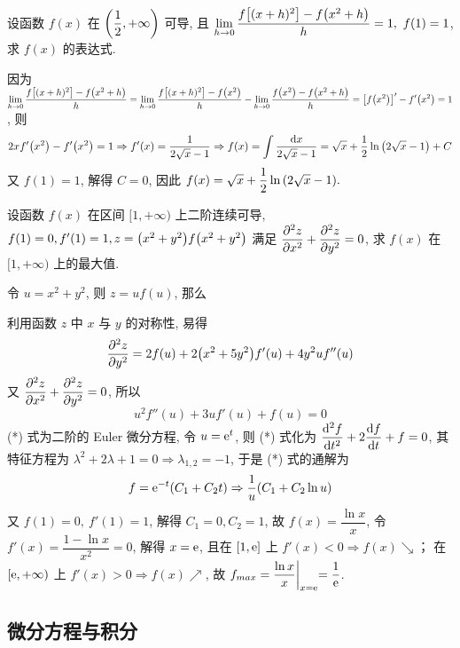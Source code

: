 \begin{example}
    设函数 $f(x)$ 在 $\qty(\dfrac{1}{2},+\infty)$ 可导, 且 $\displaystyle\lim_{h\to0}\dfrac{f\qty[(x+h)^2]-f\qty(x^2+h)}{h}=1,~f(1)=1$, 求 $f(x)$ 的表达式.
\end{example}
\begin{solution}
    因为 $\displaystyle\lim_{h\to0}\dfrac{f\qty[(x+h)^2]-f\qty(x^2+h)}{h}=\lim_{h\to0}\dfrac{f\qty[(x+h)^2]-f\qty(x^2)}{h}-\lim_{h\to0}\dfrac{f\qty(x^2)-f\qty(x^2+h)}{h}=\qty[f\qty(x^2)]'-f'\qty(x^2)=1$, 则
    $$2xf'\qty(x^2)-f'\qty(x^2)=1\Rightarrow f'(x)=\dfrac{1}{2\sqrt{x}-1}\Rightarrow f(x)=\int\dfrac{\dd x}{2\sqrt{x}-1}=\sqrt{x}+\dfrac{1}{2}\ln\qty(2\sqrt{x}-1)+C$$
    又 $f(1)=1$, 解得 $C=0$, 因此 $f(x)=\sqrt{x}+\dfrac{1}{2}\ln\qty(2\sqrt{x}-1).$
\end{solution}

\begin{example}
    设函数 $f(x)$ 在区间 $[1,+\infty)$ 上二阶连续可导, $f(1)=0,f'(1)=1,z=\qty(x^2+y^2)f\qty(x^2+y^2)$
    满足 $\displaystyle \pdv[2]{z}{x}+\pdv[2]{z}{y}=0$, 求 $f(x)$ 在 $[1,+\infty)$ 上的最大值.
\end{example}
\begin{solution}
    令 $u=x^2+y^2$, 则 $z=uf(u)$, 那么
    利用函数 $z$ 中 $x$ 与 $y$ 的对称性, 易得
    $$\pdv[2]{z}{y}=2f(u)+2\qty(x^2+5y^2)f'(u)+4y^2uf''(u)$$
    又 $\displaystyle \pdv[2]{z}{x}+\pdv[2]{z}{y}=0$, 所以
    \begin{equation*}
        u^2f''(u)+3uf'(u)+f(u)=0
        \tag{*}
    \end{equation*}
    (*) 式为二阶的 Euler 微分方程, 令 $u=\mathrm{e} ^t$, 则
    (*) 式化为 $\displaystyle \dv[2]{f}{t}+2\dv{f}{t}+f=0$, 其特征方程为 $\lambda^2+2\lambda+1=0\Rightarrow \lambda_{1,2}=-1$, 于是 (*) 式的通解为
    $$f=\mathrm{e} ^{-t}(C_1+C_2t)\Rightarrow \dfrac{1}{u}(C_1+C_2\ln u)$$
    又 $f(1)=0,~f'(1)=1$, 解得 $C_1=0,C_2=1$, 故 $f(x)=\dfrac{\ln x}{x}$, 令 $f'(x)=\dfrac{1-\ln x}{x^2}=0$, 解得 $x=\mathrm{e} $, 且在 $[1,\mathrm{e} ]$ 上 $f'(x)<0\Rightarrow f(x)\searrow$；
    在 $[\mathrm{e} ,+\infty)$ 上 $f'(x)>0\Rightarrow f(x)\nearrow$, 故 $f_{max}=\dfrac{\ln x}{x}\biggl |_{x=\mathrm{e} }=\dfrac{1}{\mathrm{e} }$.
\end{solution}

\subsection{微分方程与积分}

